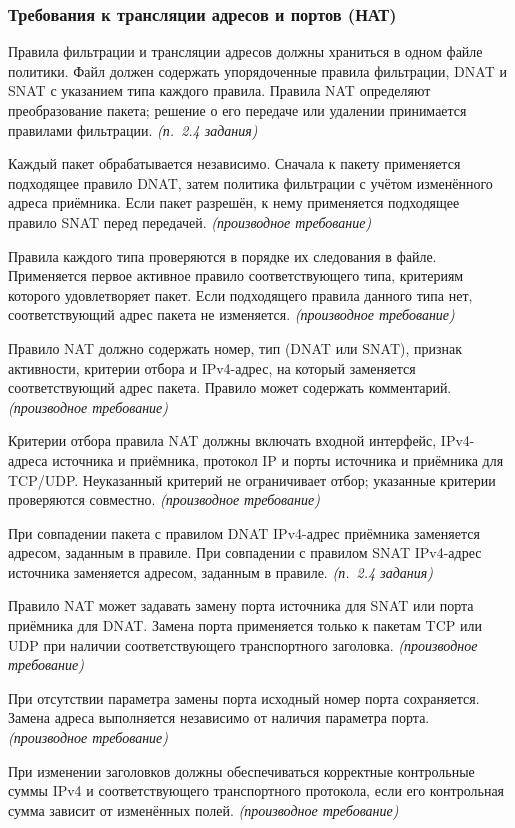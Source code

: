 \documentclass[12pt,a4paper,final]{article}
\newenvironment{reqs}
  {\begin{description}[style=sameline,leftmargin=2.2cm,labelwidth=2.0cm,
     labelsep=0.2cm,font=\normalfont\bfseries,itemsep=3pt]}
  {\end{description}}
\newcommand{\src}[1]{\textit{(п.~#1 задания)}}
\newcommand{\der}{\textit{(производное требование)}}
\begin{document}
\subsubsection{Требования к трансляции адресов и портов (НАТ)}
\begin{reqs}
\item[НАТ-01] Правила фильтрации и трансляции адресов должны храниться в одном файле политики. Файл должен содержать упорядоченные правила фильтрации, DNAT и SNAT с указанием типа каждого правила. Правила NAT определяют преобразование пакета; решение о его передаче или удалении принимается правилами фильтрации. \src{2.4}
\item[НАТ-02] Каждый пакет обрабатывается независимо. Сначала к пакету применяется подходящее правило DNAT, затем политика фильтрации с учётом изменённого адреса приёмника. Если пакет разрешён, к нему применяется подходящее правило SNAT перед передачей. \der
\item[НАТ-03] Правила каждого типа проверяются в порядке их следования в файле. Применяется первое активное правило соответствующего типа, критериям которого удовлетворяет пакет. Если подходящего правила данного типа нет, соответствующий адрес пакета не изменяется. \der
\item[НАТ-04] Правило NAT должно содержать номер, тип (DNAT или SNAT), признак активности, критерии отбора и IPv4-адрес, на который заменяется соответствующий адрес пакета. Правило может содержать комментарий. \der
\item[НАТ-05] Критерии отбора правила NAT должны включать входной интерфейс, IPv4-адреса источника и приёмника, протокол IP и порты источника и приёмника для TCP/UDP. Неуказанный критерий не ограничивает отбор; указанные критерии проверяются совместно. \der
\item[НАТ-06] При совпадении пакета с правилом DNAT IPv4-адрес приёмника заменяется адресом, заданным в правиле. При совпадении с правилом SNAT IPv4-адрес источника заменяется адресом, заданным в правиле. \src{2.4}
\item[НАТ-07] Правило NAT может задавать замену порта источника для SNAT или порта приёмника для DNAT. Замена порта применяется только к пакетам TCP или UDP при наличии соответствующего транспортного заголовка. \der
\item[НАТ-08] При отсутствии параметра замены порта исходный номер порта сохраняется. Замена адреса выполняется независимо от наличия параметра порта. \der
\item[НАТ-9] При изменении заголовков должны обеспечиваться корректные контрольные суммы IPv4 и соответствующего транспортного протокола, если его контрольная сумма зависит от изменённых полей. \der

\end{reqs}
\end{document}
